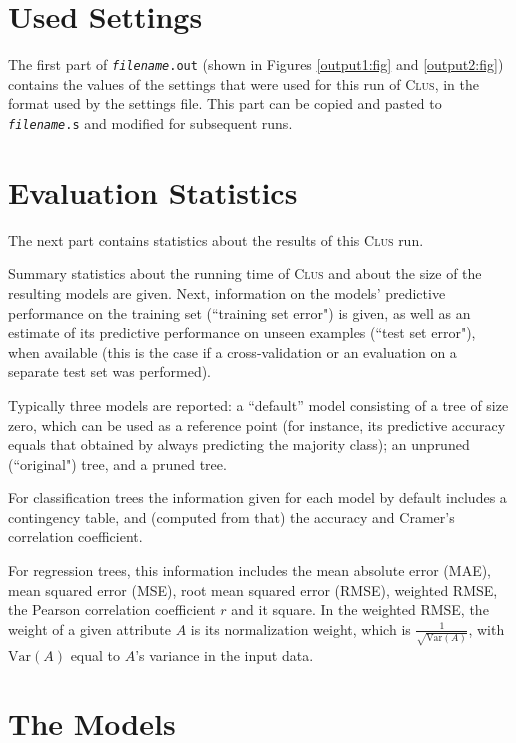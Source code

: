 \documentclass[a4paper]{report}
\newcommand{\clus}{\textsc{Clus}}
\begin{document}
\section{Used Settings}

The first part of {\tt {\em filename}.out} (shown in Figures \ref{output1:fig} and \ref{output2:fig}) contains the values of the settings that were used for this run of \clus{}, in the format used by the settings file.  This part can be copied and pasted to {\tt {\em filename}.s} and modified for subsequent runs.

\section{Evaluation Statistics}

The next part contains statistics about the results of this \clus{} run.

Summary statistics about the running time of \clus{} and about the size of the resulting models are given.  Next, information on the models' predictive performance on the training set (``training set error") is given, as well as an estimate of its predictive performance on unseen examples (``test set error"), when available (this is the case if a cross-validation or an evaluation on a separate test set was performed).  

Typically three models are reported: a ``default'' model consisting of a tree of size zero, which can be used as a reference point (for instance, its predictive accuracy equals that obtained by always predicting the majority class); an unpruned (``original") tree, and a pruned tree.

For classification trees the information given for each model by default includes a contingency table, and (computed from that) the accuracy and Cramer's correlation coefficient.

For regression trees, this information includes the mean absolute error (MAE), mean squared error (MSE), root mean squared error (RMSE), weighted RMSE, the Pearson correlation coefficient $r$ and it square.  In the weighted RMSE, the weight of a given attribute $A$ is its normalization weight, which is $\frac{1}{\sqrt{\mathrm{Var}(A)}}$, with $\mathrm{Var}(A)$ equal to $A$'s variance in the input data. 

\section{The Models}
\end{document}
